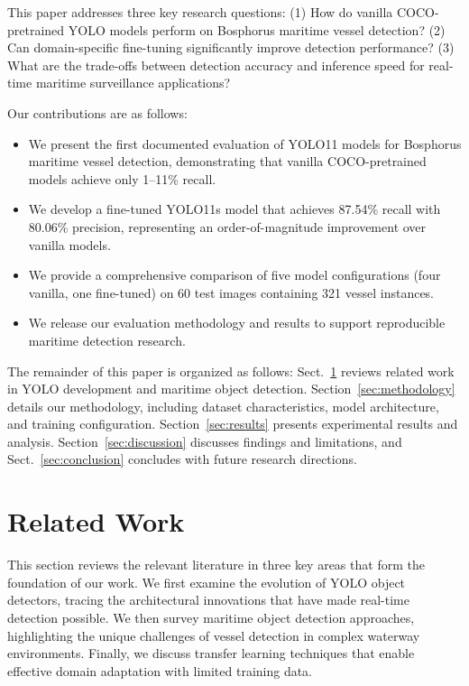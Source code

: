 \documentclass[pdflatex,sn-mathphys-num,Numbered]{sn-jnl}
\begin{document}
This paper addresses three key research questions: (1) How do vanilla COCO-pretrained YOLO models perform on Bosphorus maritime vessel detection? (2) Can domain-specific fine-tuning significantly improve detection performance? (3) What are the trade-offs between detection accuracy and inference speed for real-time maritime surveillance applications?

Our contributions are as follows:
\begin{itemize}
    \item We present the first documented evaluation of YOLO11 models for Bosphorus maritime vessel detection, demonstrating that vanilla COCO-pretrained models achieve only 1--11\% recall.
    \item We develop a fine-tuned YOLO11s model that achieves 87.54\% recall with 80.06\% precision, representing an order-of-magnitude improvement over vanilla models.
    \item We provide a comprehensive comparison of five model configurations (four vanilla, one fine-tuned) on 60 test images containing 321 vessel instances.
    \item We release our evaluation methodology and results to support reproducible maritime detection research.
\end{itemize}

The remainder of this paper is organized as follows: Sect.~\ref{sec:related} reviews related work in YOLO development and maritime object detection. Section~\ref{sec:methodology} details our methodology, including dataset characteristics, model architecture, and training configuration. Section~\ref{sec:results} presents experimental results and analysis. Section~\ref{sec:discussion} discusses findings and limitations, and Sect.~\ref{sec:conclusion} concludes with future research directions.

\section{Related Work}\label{sec:related}

This section reviews the relevant literature in three key areas that form the foundation of our work. We first examine the evolution of YOLO object detectors, tracing the architectural innovations that have made real-time detection possible. We then survey maritime object detection approaches, highlighting the unique challenges of vessel detection in complex waterway environments. Finally, we discuss transfer learning techniques that enable effective domain adaptation with limited training data.
\end{document}
